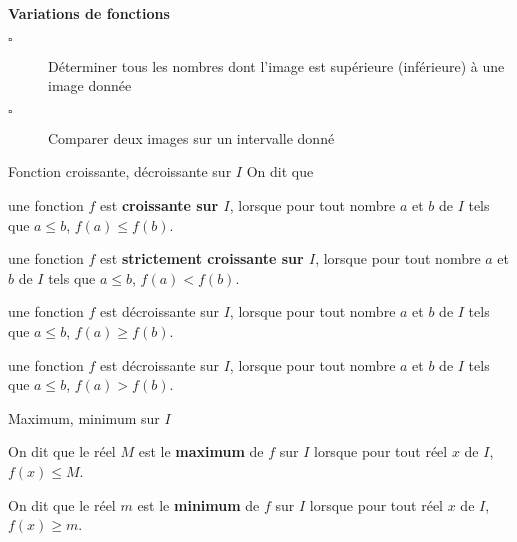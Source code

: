 \begin{seance}

\end{seance}


\begin{CpsCol}
\textbf{Variations de fonctions}
\begin{description}
\item[$\square$] Déterminer tous les nombres dont l'image est supérieure (inférieure) à une image donnée
\item[$\square$] Comparer deux images sur un intervalle donné
\end{description}
\end{CpsCol}


\begin{multicols}{2}

\end{multicols}

\begin{DefT}{Fonction croissante, décroissante sur $I$} 
On dit que
\begin{description}[leftmargin=*]
\item[•] une fonction $f$ est \textbf{croissante sur $I$}, lorsque pour tout nombre $a$ et $b$ de $I$ tels que $a \leq b$, $f(a) \leq f(b)$.
\item[•] une fonction $f$ est \textbf{strictement croissante sur $I$}, lorsque pour tout nombre $a$ et $b$ de $I$ tels que $a \leq b$, $f(a) < f(b)$.
\item[•] une fonction $f$ est décroissante sur $I$, lorsque pour tout nombre $a$ et $b$ de $I$ tels que $a \leq b$, $f(a) \geq f(b)$.
\item[•] une fonction $f$ est décroissante sur $I$, lorsque pour tout nombre $a$ et $b$ de $I$ tels que $a \leq b$, $f(a) > f(b)$.
\end{description} 
\end{DefT}



\begin{DefT}{Maximum, minimum sur $I$} 
\begin{description}[leftmargin=*]
\item[•] On dit que le réel $M$ est le \textbf{maximum} de $f$ sur $I$ lorsque pour tout réel $x$ de $I$, $f(x) \leq M$.
\item[•] On dit que le réel $m$ est le \textbf{minimum} de $f$ sur $I$ lorsque pour tout réel $x$ de $I$, $f(x) \geq m$.
\end{description} 
\end{DefT}







